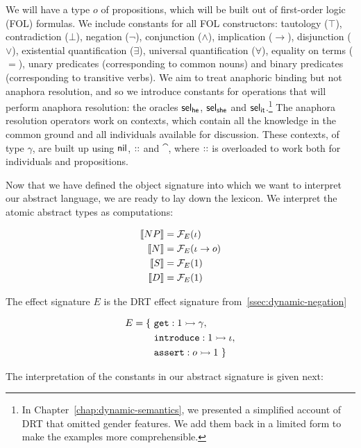 We will have a type $o$ of propositions, which will be built out of
first-order logic (FOL) formulas. We include constants for all FOL
constructors: tautology ($\top$), contradiction ($\bot$), negation
($\lnot$), conjunction ($\land$), implication ($\to$), disjunction
($\lor$), existential quantification ($\exists$), universal quantification
($\forall$), equality on terms ($=$), unary predicates (corresponding to
common nouns) and binary predicates (corresponding to transitive verbs). We
aim to treat anaphoric binding but not anaphora resolution, and so we
introduce constants for operations that will perform anaphora resolution:
the oracles $\mathsf{sel}_{\mathsf{he}}$, $\mathsf{sel}_{\mathsf{she}}$ and $\mathsf{sel}_{\mathsf{it}}$.\footnote{In
  Chapter~\ref{chap:dynamic-semantics}, we presented a simplified account
  of DRT that omitted gender features. We add them back in a limited form
  to make the examples more comprehensible.} The anaphora resolution
operators work on contexts, which contain all the knowledge in the common
ground and all individuals available for discussion. These contexts, of
type $\gamma$, are built up using $\mathsf{nil}$, $\mathbin{::}$ and $\cat$, where $\mathbin{::}$
is overloaded to work both for individuals and propositions.

Now that we have defined the object signature into which we want to
interpret our abstract language, we are ready to lay down the
lexicon. We interpret the atomic abstract types as computations:

\begin{align*}
  \llbracket NP \rrbracket &= \mathcal{F}_E(\iota) \\
  \llbracket N \rrbracket &= \mathcal{F}_E(\iota \to o) \\
  \llbracket S \rrbracket &= \mathcal{F}_E(1) \\
  \llbracket D \rrbracket &= \mathcal{F}_E(1)
\end{align*}

The effect signature $E$ is the DRT effect signature
from~\ref{ssec:dynamic-negation}

\begin{align*}
  E = \{\ &\mathtt{get} : 1 \rightarrowtail \gamma, \\
          &\mathtt{introduce} : 1 \rightarrowtail \iota, \\
          &\mathtt{assert} : o \rightarrowtail 1\ \}
\end{align*}

The interpretation of the constants in our abstract signature is given
next:

